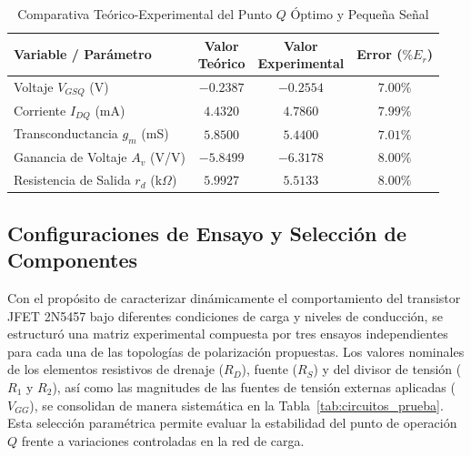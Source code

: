 \documentclass[conference]{IEEEtran}
\begin{document}
\begin{table}[htbp]
    \caption{Comparativa Teórico-Experimental del Punto $Q$ Óptimo y Pequeña Señal}\label{tab:comparacion_q}
    \centering
    \begin{tabular}{lccc}
        \toprule
        \textbf{Variable / Parámetro}           & \makecell{\textbf{Valor}\\ \textbf{Teórico}} & \makecell{\textbf{Valor}\\ \textbf{Experimental}} & \makecell{\textbf{Error}\\ \textbf{($\%E_r$)}} \\
        \midrule
        Voltaje $V_{GSQ}$ (V)                   & $-0.2387$                                    & $-0.2554$                                         & $7.00\%$                                       \\
        Corriente $I_{DQ}$ (mA)                 & $4.4320$                                     & $4.7860$                                          & $7.99\%$                                       \\
        Transconductancia $g_m$ (mS)            & $5.8500$                                     & $5.4400$                                          & $7.01\%$                                       \\
        Ganancia de Voltaje $A_v$ (V/V)         & $-5.8499$                                    & $-6.3178$                                         & $8.00\%$                                       \\
        Resistencia de Salida $r_d$ (k$\Omega$) & $5.9927$                                     & $5.5133$                                          & $8.00\%$                                       \\
        \bottomrule
    \end{tabular}
\end{table}

\subsection{Configuraciones de Ensayo y Selección de Componentes}
Con el propósito de caracterizar dinámicamente el comportamiento del transistor
JFET 2N5457 bajo diferentes condiciones de carga y niveles de conducción, se
estructuró una matriz experimental compuesta por tres ensayos independientes
para cada una de las topologías de polarización propuestas. Los valores
nominales de los elementos resistivos de drenaje ($R_D$), fuente ($R_S$) y del
divisor de tensión ($R_1$ y $R_2$), así como las magnitudes de las fuentes de
tensión externas aplicadas ($V_{GG}$), se consolidan de manera sistemática en
la Tabla~\ref{tab:circuitos_prueba}. Esta selección paramétrica permite evaluar
la estabilidad del punto de operación $Q$ frente a variaciones controladas en
la red de carga.
\end{document}
